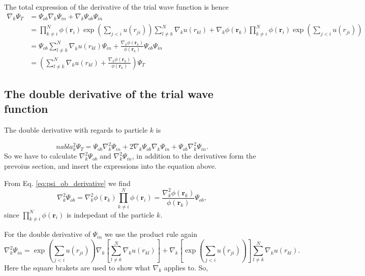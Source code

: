 The total expression of the derivative of the trial wave function is hence 
\begin{align}
\nabla_k \Psi_T &= \Psi_{ob}\nabla_k\Psi_{in} + \nabla_k\Psi_{ob}\Psi_{in}\\
 &= \prod_{k\neq i}^N \phi(\mathbf{r}_i)\exp{\left(\sum_{j<i}u(r_{ji})\right)} \sum^N_{l \neq k} \nabla_k u (r_{kl}) + \nabla_k \phi(\mathbf{r}_k)\prod_{k\neq i}^N \phi(\mathbf{r}_i) \exp{\left(\sum_{j<i}u(r_{ji})\right)}\\
 &= \Psi_{ob}\sum^N_{l \neq k} \nabla_k u (r_{kl}) \Psi_{in}+ \frac{\nabla_k \phi(\mathbf{r}_k)}{\phi(\mathbf{r}_k)} \Psi_{ob}\Psi_{in}\\
 &= \left(\sum^N_{l \neq k} \nabla_k u (r_{kl})+ \frac{\nabla_k \phi(\mathbf{r}_k)}{\phi(\mathbf{r}_k)}\right) \Psi_T 
\end{align}

\subsection{The double derivative of the trial wave function}

The double derivative with regards to particle $k$ is

\begin{equation}\label{eq:total_double_start}
nabla^2_k \Psi_T =  \Psi_{ob}\nabla^2_k\Psi_{in} + 2\nabla_k\Psi_{ob}\nabla_k\Psi_{in} + \Psi_{ob}\nabla^2_k\Psi_{in}.
\end{equation}
So we have to calculate $\nabla^2_k\Psi_{ob}$ and $\nabla^2_k\Psi_{in}$, in addition to the derivatives form the prevoius section, and insert the expressions into the equation above.

From Eq. \ref{eq:psi_ob_derivative} we find
$$ \nabla^2_k\Psi_{ob} = \nabla^2_k \phi(\mathbf{r}_k)\prod_{k\neq i}^N \phi(\mathbf{r}_i) = \frac{\nabla^2_k \phi(\mathbf{r}_k)}{\phi(\mathbf{r}_k)} \Psi_{ob},$$
since $\prod_{k\neq i}^N \phi(\mathbf{r}_i)$ is indepedant of the particle $k$.

For the double derivative of $\Psi_{in}$ we use the product rule again
\begin{equation}\label{eq:double_derivative_start}
\nabla^2_k\Psi_{in} = \exp{\left(\sum_{j<i}u(r_{ji})\right)} \nabla_k\left[ \sum^N_{l \neq k} \nabla_k u (r_{kl})\right] +\nabla_k\left[ \exp{\left(\sum_{j<i}u(r_{ji})\right)}\right] \sum^N_{l \neq k} \nabla_k u (r_{kl}).
\end{equation}
Here the square brakets are used to show what $\nabla_k$ applies to. So,

